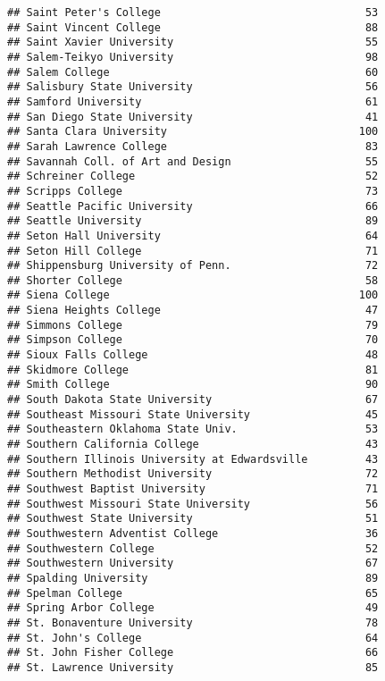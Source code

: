 \documentclass[
]{article}
\begin{document}
\begin{verbatim}
## Saint Peter's College                                53
## Saint Vincent College                                88
## Saint Xavier University                              55
## Salem-Teikyo University                              98
## Salem College                                        60
## Salisbury State University                           56
## Samford University                                   61
## San Diego State University                           41
## Santa Clara University                              100
## Sarah Lawrence College                               83
## Savannah Coll. of Art and Design                     55
## Schreiner College                                    52
## Scripps College                                      73
## Seattle Pacific University                           66
## Seattle University                                   89
## Seton Hall University                                64
## Seton Hill College                                   71
## Shippensburg University of Penn.                     72
## Shorter College                                      58
## Siena College                                       100
## Siena Heights College                                47
## Simmons College                                      79
## Simpson College                                      70
## Sioux Falls College                                  48
## Skidmore College                                     81
## Smith College                                        90
## South Dakota State University                        67
## Southeast Missouri State University                  45
## Southeastern Oklahoma State Univ.                    53
## Southern California College                          43
## Southern Illinois University at Edwardsville         43
## Southern Methodist University                        72
## Southwest Baptist University                         71
## Southwest Missouri State University                  56
## Southwest State University                           51
## Southwestern Adventist College                       36
## Southwestern College                                 52
## Southwestern University                              67
## Spalding University                                  89
## Spelman College                                      65
## Spring Arbor College                                 49
## St. Bonaventure University                           78
## St. John's College                                   64
## St. John Fisher College                              66
## St. Lawrence University                              85

\end{verbatim}
\end{document}
